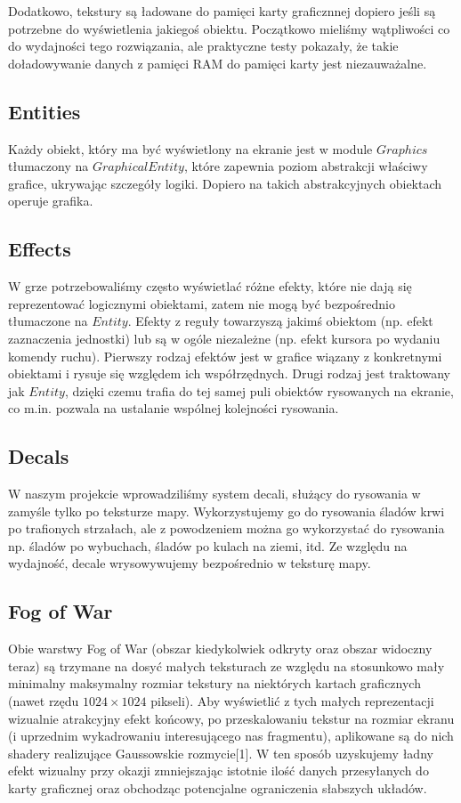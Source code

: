 \documentclass[licencjacka]{pracamgr}
\begin{document}
      Dodatkowo, tekstury są ładowane do pamięci karty graficznnej dopiero jeśli są potrzebne do wyświetlenia jakiegoś
      obiektu. Początkowo mieliśmy wątpliwości co do wydajności tego rozwiązania, ale praktyczne testy pokazały, że
      takie doładowywanie danych z pamięci RAM do pamięci karty jest niezauważalne.

    \subsection{Entities}
      Każdy obiekt, który ma być wyświetlony na ekranie jest w module $Graphics$ tłumaczony na $GraphicalEntity$, które
      zapewnia poziom abstrakcji właściwy grafice, ukrywając szczegóły logiki. Dopiero na takich abstrakcyjnych
      obiektach operuje grafika.

    \subsection{Effects}
      W grze potrzebowaliśmy często wyświetlać różne efekty, które nie dają się reprezentować logicznymi obiektami,
      zatem nie mogą być bezpośrednio tłumaczone na $Entity$. Efekty z reguły towarzyszą jakimś obiektom (np. efekt
      zaznaczenia jednostki) lub są w ogóle niezależne (np. efekt kursora po wydaniu komendy ruchu). Pierwszy rodzaj
      efektów jest w grafice wiązany z konkretnymi obiektami i rysuje się względem ich współrzędnych. Drugi rodzaj jest
      traktowany jak $Entity$, dzięki czemu trafia do tej samej puli obiektów rysowanych na ekranie, co m.in. pozwala na
      ustalanie wspólnej kolejności rysowania.

    \subsection{Decals}
      W naszym projekcie wprowadziliśmy system decali, służący do rysowania w zamyśle tylko po teksturze mapy.
      Wykorzystujemy go do rysowania śladów krwi po trafionych strzałach, ale z powodzeniem można go wykorzystać do
      rysowania np. śladów po wybuchach, śladów po kulach na ziemi, itd. Ze względu na wydajność, decale wrysowywujemy
      bezpośrednio w teksturę mapy.

    \subsection{Fog of War}
      Obie warstwy Fog of War (obszar kiedykolwiek odkryty oraz obszar widoczny teraz) są trzymane na dosyć małych
      teksturach ze względu na stosunkowo mały minimalny maksymalny rozmiar tekstury na niektórych kartach graficznych
      (nawet rzędu $1024 \times 1024$ pikseli). Aby wyświetlić z tych małych reprezentacji wizualnie atrakcyjny efekt
      końcowy, po przeskalowaniu tekstur na rozmiar ekranu (i uprzednim wykadrowaniu interesującego nas fragmentu),
      aplikowane są do nich shadery realizujące Gaussowskie rozmycie[1]. W ten sposób uzyskujemy ładny efekt wizualny
      przy okazji zmniejszając istotnie ilość danych przesyłanych do karty graficznej oraz obchodząc potencjalne
      ograniczenia słabszych układów.
\end{document}
